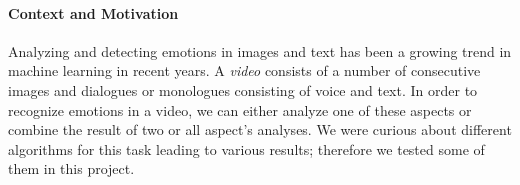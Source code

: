 %
%
%


\paragraph{Context and Motivation} Analyzing and detecting emotions in images and text has been a growing trend in machine learning in recent years. A \textit{video} consists of a number of consecutive images and dialogues or monologues consisting of voice and text. In order to recognize emotions in a video, we can either analyze one of these aspects or combine the result of two or all aspect's analyses. We were curious about different algorithms for this task leading to various results; therefore we tested some of them in this project.



